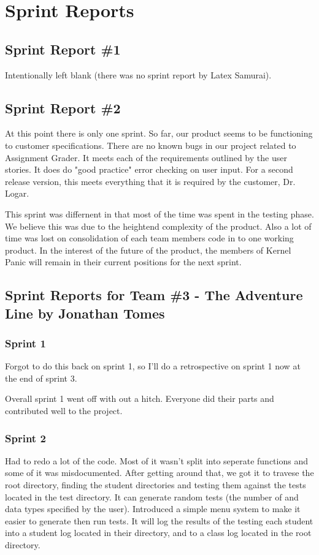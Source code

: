 
\chapter{Sprint Reports}

\section{Sprint Report \#1}
Intentionally left blank (there was no sprint report by Latex Samurai).


\section{Sprint Report \#2}

At this point there is only one sprint. So far, our product seems to be functioning to customer specifications. There are no known bugs
in our project related to Assignment Grader.
It meets
each of the requirements outlined by the user stories. It does do "good practice" error checking on user input.
For a second release version, this meets everything that it is required by the customer, Dr. Logar. 
\par{} This sprint
was differnent in that most of the time was spent in the testing phase. We believe this was due to the heightend complexity of the product. Also a lot of time was lost on consolidation of each team members code in to one working product.
In the interest of the future of the product, the members of Kernel Panic will remain in their current
positions for the next sprint.

\section{Sprint Reports for Team \#3 - The Adventure Line by Jonathan Tomes}
\subsection{Sprint 1}
Forgot to do this back on sprint 1, so I'll do a retrospective on sprint 1 now at the end of sprint 3.

Overall sprint 1 went off with out a hitch. Everyone did their parts and contributed well to the project.

\subsection{Sprint 2}
Had to redo a lot of the code. Most of it wasn't split into seperate functions and some of it was
misdocumented. After getting around that, we got it to travese the root directory, finding the
student directories and testing them against the tests located in the test directory. It can generate random
tests (the number of and data types specified by the user). Introduced a simple menu system to make it easier
to generate then run tests. It will log the results of the testing each student into a student log located in their
directory, and to a class log located in the root directory.

